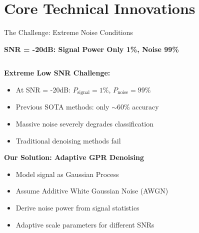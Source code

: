 \documentclass[aspectratio=169]{beamer}
\begin{document}
\section{Core Technical Innovations}

\begin{frame}{The Challenge: Extreme Noise Conditions}
\begin{center}
\textcolor{zjutred}{\Large \textbf{SNR = -20dB: Signal Power Only 1\%, Noise 99\%}}
\end{center}

\vspace{0.5cm}
\begin{columns}
\begin{column}{0.6\textwidth}
\textbf{Extreme Low SNR Challenge:}
\begin{itemize}
\item At SNR = -20dB: $P_{\text{signal}} = 1\%$, $P_{\text{noise}} = 99\%$
\item Previous SOTA methods: only $\sim$60\% accuracy
\item Massive noise severely degrades classification
\item Traditional denoising methods fail
\end{itemize}

\vspace{0.3cm}
\textbf{Our Solution: Adaptive GPR Denoising}
\begin{itemize}
\item Model signal as Gaussian Process
\item Assume Additive White Gaussian Noise (AWGN)
\item Derive noise power from signal statistics
\item Adaptive scale parameters for different SNRs
\end{itemize}
\end{column}
\begin{column}{0.4\textwidth}
\begin{center}
\end{center}
\end{column}
\end{columns}
\end{frame}
\end{document}
